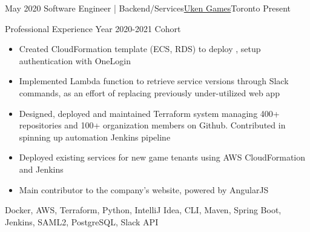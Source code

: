 %
%
%
\begin{experiences}
  \experience
    {May 2020}   {Software Engineer | Backend/Services}{\href{https://uken.com}{Uken Games}}{Toronto}
    {Present} {
                    Professional Experience Year 2020-2021 Cohort 
                    \begin{itemize}
                        \item Created CloudFormation template (ECS, RDS) to deploy , setup authentication with OneLogin
                        
                        \item Implemented Lambda function to retrieve service versions through Slack commands, as an effort of replacing previously under-utilized web app
                        
                        \item Designed, deployed and maintained Terraform system managing 400+ repositories and 100+ organization members on Github. Contributed in spinning up automation Jenkins pipeline
                        
                        \item Deployed existing services for new game tenants using AWS CloudFormation and Jenkins
                        
                        \item Main contributor to the company's website, powered by AngularJS
                    \end{itemize}
                    }
                    {Docker, AWS, Terraform, Python, IntelliJ Idea, CLI, Maven, Spring Boot, Jenkins, SAML2, PostgreSQL, Slack API}
\end{experiences}
